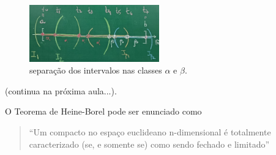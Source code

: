 \documentclass[../analysisII_notes.tex]{subfiles}
\begin{document}
\begin{proof*}
	\begin{figure}[H]
		\begin{center}
			\includegraphics[height=0.5\textheight, width=0.5\textwidth, keepaspectratio]{./Images/classified_intervals_13.png}
		\end{center}
		\caption{separação dos intervalos nas classes \(\alpha \) e \(\beta \).}
		\label{classified13}
	\end{figure}

	(continua na próxima aula...).
\end{proof*}


\begin{tcolorbox}[
		skin=enhanced,
		title=Lembrete!,
		after title={\hfill Teorema de Heine-Borel},
		fonttitle=\bfseries,
		sharp corners=downhill,
		colframe=black,
		colbacktitle=yellow!75!white,
		colback=yellow!30,
		colbacklower=black,
		coltitle=black,
		drop large lifted shadow
	]
	O \hypertarget{heine_borel}{Teorema de Heine-Borel} pode ser enunciado como
	\begin{quote}
		``Um compacto no espaço euclideano n-dimensional é totalmente caracterizado (se, e somente se) como sendo fechado e limitado''
	\end{quote}
\end{tcolorbox}
\end{document}
